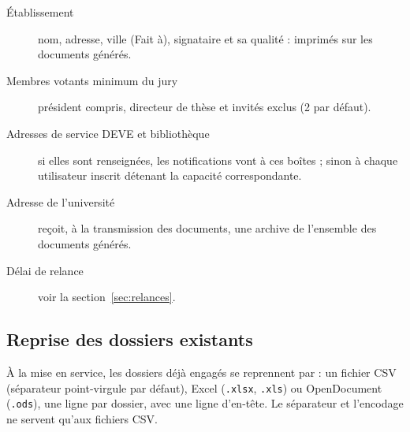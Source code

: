 \documentclass[11pt,a4paper]{article}
\begin{document}
\begin{description}
  \item[Établissement] nom, adresse, ville (\og Fait à\fg{}), signataire et sa
        qualité : imprimés sur les documents générés.
  \item[Membres votants minimum du jury] président compris, directeur de
        thèse et invités exclus (2 par défaut).
  \item[Adresses de service DEVE et bibliothèque] si elles sont renseignées,
        les notifications vont à ces boîtes ; sinon à chaque utilisateur inscrit
        détenant la capacité correspondante.
  \item[Adresse de l'université] reçoit, à la transmission des documents, une
        archive de l'ensemble des documents générés.
  \item[Délai de relance] voir la section~\ref{sec:relances}.
\end{description}

\subsection{Reprise des dossiers existants}

À la mise en service, les dossiers déjà engagés se reprennent par
 : un fichier CSV (séparateur point-virgule par
défaut), Excel (\texttt{.xlsx}, \texttt{.xls}) ou OpenDocument (\texttt{.ods}),
une ligne par dossier, avec une ligne d'en-tête. Le séparateur et l'encodage ne
servent qu'aux fichiers CSV.
\end{document}
